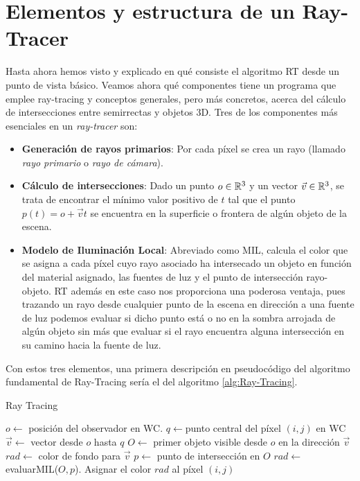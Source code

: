 \section{Elementos y estructura de un Ray-Tracer}
\label{section:elementos-RT}

Hasta ahora hemos visto y explicado en qué consiste el algoritmo RT desde un punto de vista básico. Veamos ahora qué componentes tiene un programa que emplee ray-tracing y conceptos generales, pero más concretos, acerca del cálculo de intersecciones entre semirrectas y objetos 3D. Tres de los componentes más esenciales en un \textit{ray-tracer} son:

\begin{itemize}
    \item \textbf{Generación de rayos primarios}: Por cada píxel se crea un rayo (llamado \textit{rayo primario} o \textit{rayo de cámara}).
    \item \textbf{Cálculo de intersecciones}: Dado un punto $o\in\mathbb{R}^3$ y un vector $\vec v\in\mathbb{R}^3$, se trata de encontrar el mínimo valor positivo de $t$ tal que el punto $p(t)=o+\vec v t$ se encuentra en la superficie o frontera de algún objeto de la escena.
    \item \textbf{Modelo de Iluminación Local}: Abreviado como MIL, calcula el color que se asigna a cada píxel cuyo rayo asociado ha intersecado un objeto en función del material asignado, las fuentes de luz y el punto de intersección rayo-objeto. RT además en este caso nos proporciona una poderosa ventaja, pues trazando un rayo desde cualquier punto de la escena en dirección a una fuente de luz podemos evaluar si dicho punto está o no en la sombra arrojada de algún objeto sin más que evaluar si el rayo encuentra alguna intersección en su camino hacia la fuente de luz.
\end{itemize}

Con estos tres elementos, una primera descripción en pseudocódigo del algoritmo fundamental de Ray-Tracing sería el del algoritmo \ref{alg:Ray-Tracing}.

\begin{algorithm}[H]
    \caption{Ray Tracing} \label{alg:Ray-Tracing}
    \begin{algorithmic}
        \State $o\gets$ posición del observador en WC.
            \State $q\gets$punto central del píxel $(i,j)$ en WC
            \State $\vec v\gets$ vector desde $o$ hasta $q$
            \State $O\gets$ primer objeto visible desde $o$ en la dirección $\vec v$
                \State $rad\gets$ color de fondo para $\vec v$ 
            \Else
                \State $p\gets$ punto de intersección en $O$
                \State $rad\gets$ evaluarMIL($O,p$).
            \EndIf
            \State Asignar el color $rad$ al píxel $(i,j)$
        \EndFor
    \end{algorithmic}
\end{algorithm}

